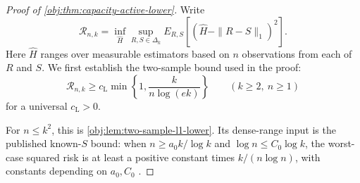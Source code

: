 \begin{proof}[Proof of \cref{obj:thm:capacity-active-lower}]
Write
\[
\mathcal R_{n,k}
=\inf_{\widehat H}\sup_{R,S\in\Delta_k}
E_{R,S}\!\left[(\widehat H-\|R-S\|_1)^2\right].
\] %
Here \(\widehat H\) ranges over measurable estimators based on \(n\) observations from each of \(R\) and \(S\). We first establish the two-sample bound used in the proof:
\[
\mathcal R_{n,k}\ge c_{\mathrm L}
\min\left\{1,\frac{k}{n\log(ek)}\right\}
\qquad(k\ge2,\ n\ge1)
\]
for a universal \(c_{\mathrm L}>0\). %

For \(n\le k^2\), this is \cref{obj:lem:two-sample-l1-lower}. Its dense-range input is the published known-\(S\) bound: when \(n\ge a_0k/\log k\) and \(\log n\le C_0\log k\), the worst-case squared risk is at least a positive constant times \(k/(n\log n)\), with constants depending on \(a_0,C_0\) \citep[Theorem 3 and the unknown-both-distributions reduction following Theorem 6]{JiaoHanWeissman2018}. %


\end{proof}
